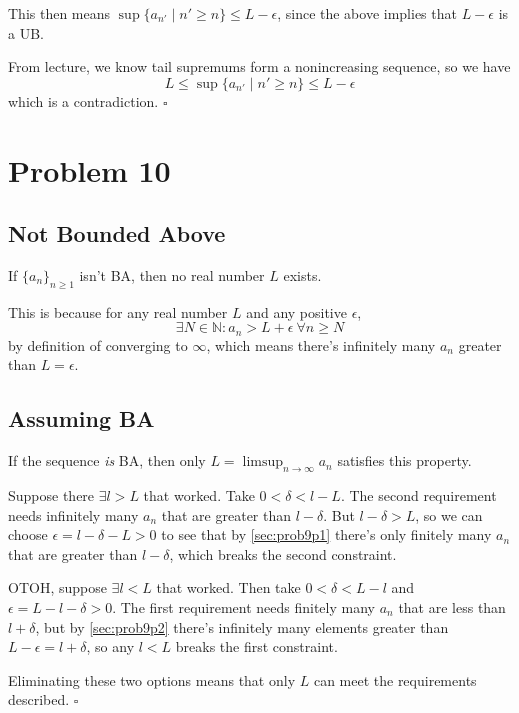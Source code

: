 \documentclass[12pt]{article}
\newcommand{\N}{\mathbb{N}}
\begin{document}
This then means $\sup \{a_{n'} \mid n' \ge n\} \le L-\epsilon$,
since the above implies that $L-\epsilon$ is a UB.

From lecture, we know tail supremums form a nonincreasing sequence, so we have
\[L \le \sup \{a_{n'} \mid n' \ge n\} \le L-\epsilon\]
which is a contradiction. $\square$

\pagebreak

\section{Problem 10}

\subsection{Not Bounded Above}

If $\{a_n\}_{n \ge 1}$ isn't BA, then no real number $L$ exists.

This is because for any real number $L$ and any positive $\epsilon$,
\[\exists N \in \N: a_n > L+\epsilon\ \forall n \ge N\]
by definition of converging to $\infty$, which means there's infinitely many $a_n$ greater than $L=\epsilon$.

\subsection{Assuming BA}

If the sequence \textit{is} BA, then only $L=\limsup_{n \to \infty} a_n$ satisfies this property.

Suppose there $\exists l > L$ that worked.
Take $0 < \delta < l-L$.
The second requirement needs infinitely many $a_n$ that are greater than $l-\delta$.
But $l-\delta > L$, so we can choose $\epsilon=l-\delta-L > 0$
to see that by \ref{sec:prob9p1} there's only finitely many $a_n$ that are greater than $l-\delta$,
which breaks the second constraint.

OTOH, suppose $\exists l < L$ that worked.
Then take $0 < \delta < L-l$ and $\epsilon = L-l-\delta > 0$.
The first requirement needs finitely many $a_n$ that are less than $l+\delta$,
but by \ref{sec:prob9p2} there's infinitely many elements greater than $L-\epsilon = l+\delta$,
so any $l < L$ breaks the first constraint.

Eliminating these two options means that only $L$ can meet the requirements described. $\square$
\end{document}

